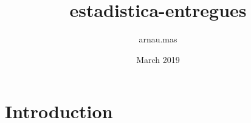 \documentclass{article}
\title{estadistica-entregues}
\author{arnau.mas }
\date{March 2019}
\begin{document}
\maketitle

\section{Introduction}
\end{document}
